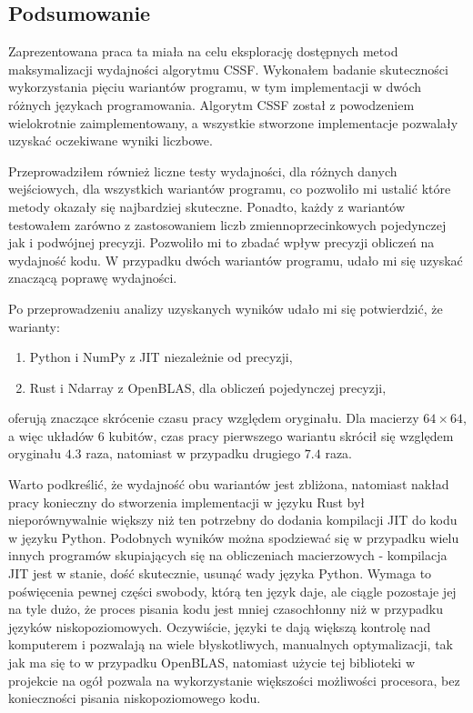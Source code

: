 \documentclass[11pt, a4paper]{article}
\begin{document}
\begin{sloppypar}
    \subsection{Podsumowanie}
    Zaprezentowana praca ta miała na celu eksplorację dostępnych metod maksymalizacji wydajności
    algorytmu CSSF. Wykonałem badanie skuteczności wykorzystania pięciu wariantów
    programu, w tym implementacji w dwóch różnych językach programowania. Algorytm CSSF
    został z powodzeniem wielokrotnie zaimplementowany, a wszystkie stworzone implementacje
    pozwalały uzyskać oczekiwane wyniki liczbowe.

    Przeprowadziłem również liczne testy wydajności, dla różnych danych wejściowych, dla
    wszystkich wariantów programu, co pozwoliło mi ustalić które metody okazały się
    najbardziej skuteczne. Ponadto, każdy z wariantów testowałem zarówno z zastosowaniem
    liczb zmiennoprzecinkowych pojedynczej jak i podwójnej precyzji. Pozwoliło mi to zbadać
    wpływ precyzji obliczeń na wydajność kodu. W przypadku dwóch wariantów programu, udało
    mi się uzyskać znaczącą poprawę wydajności.

    Po przeprowadzeniu analizy uzyskanych wyników udało mi się potwierdzić, że warianty:
    \begin{enumerate}
      \item Python i NumPy z JIT niezależnie od precyzji,

      \item Rust i Ndarray z OpenBLAS, dla obliczeń pojedynczej precyzji,
    \end{enumerate}

    oferują znaczące skrócenie czasu pracy względem oryginału. Dla macierzy $64\times64$,
    a więc układów 6 kubitów, czas pracy pierwszego wariantu skrócił się względem oryginału
    $4.3$ raza, natomiast w przypadku drugiego $7.4$ raza.

    Warto podkreślić, że wydajność obu wariantów jest zbliżona, natomiast nakład pracy
    konieczny do stworzenia implementacji w języku Rust był nieporównywalnie większy niż
    ten potrzebny do dodania kompilacji JIT do kodu w języku Python. Podobnych wyników można
    spodziewać się w przypadku wielu innych programów skupiających się na obliczeniach macierzowych
    - kompilacja JIT jest w stanie, dość skutecznie, usunąć wady języka Python. Wymaga
    to poświęcenia pewnej części swobody, którą ten język daje, ale ciągle pozostaje jej
    na tyle dużo, że proces pisania kodu jest mniej czasochłonny niż w przypadku języków
    niskopoziomowych. Oczywiście, języki te dają większą kontrolę nad komputerem i pozwalają
    na wiele błyskotliwych, manualnych optymalizacji, tak jak ma się to w przypadku OpenBLAS,
    natomiast użycie tej biblioteki w projekcie na ogół pozwala na wykorzystanie
    większości możliwości procesora, bez konieczności pisania niskopoziomowego kodu.


\end{sloppypar}
\end{document}
